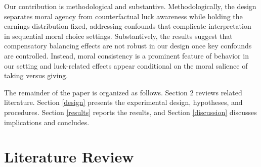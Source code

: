 \documentclass{article}
\begin{document}
\par
Our contribution is methodological and substantive. Methodologically, the design separates moral agency from counterfactual luck awareness while holding the earnings distribution fixed, addressing confounds that complicate interpretation in sequential moral choice settings. Substantively, the results suggest that compensatory balancing effects are not robust in our design once key confounds are controlled. Instead, moral consistency is a prominent feature of behavior in our setting and luck-related effects appear conditional on the moral salience of taking versus giving.
\par
The remainder of the paper is organized as follows. Section 2 reviews related literature. Section \ref{design} presents the experimental design, hypotheses, and procedures. Section \ref{results} reports the results, and Section \ref{discussion} discusses implications and concludes.


\section{Literature Review}
\end{document}
